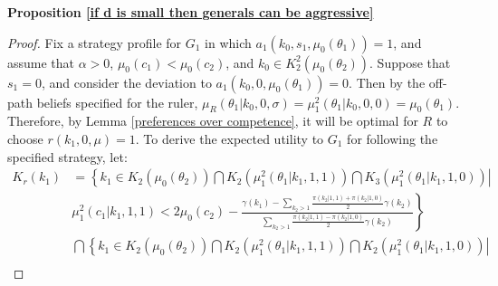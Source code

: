 \documentclass[11pt,]{article}
\begin{document}
\noindent\textbf{Proposition \ref{if d is small then generals can be aggressive}}
\begin{proof}Fix a strategy profile for $G_1$ in which $a_1(k_0,s_1,\mu_0(\theta_1))=1$, and assume that $\alpha>0$, $\mu_0(c_1)<\mu_0(c_2)$, and $k_0\in K^2_2(\mu_0(\theta_2))$.  Suppose that $s_1=0$, and consider the deviation to $a_1(k_0,0,\mu_0(\theta_1))=0$.  Then by the off-path beliefs specified for the ruler, $\mu_R(\theta_1|k_0,0,\sigma)=\mu_1^2(\theta_1|k_0,0,0)=\mu_0(\theta_1)$.  Therefore, by Lemma \ref{preferences over competence}, it will be optimal for $R$ to choose $r(k_1,0,\mu)=1$.  To derive the expected utility to $G_1$ for following the specified strategy, let:
\begin{align*}
K_r(k_1)&=\left\{k_1\in \left.K_2(\mu_0(\theta_2))\bigcap K_2(\mu_1^2(\theta_1|k_1,1,1))\bigcap K_3(\mu_1^2(\theta_1|k_1,1,0))\right|\right.\\
&\left.\mu_1^2(c_1|k_1,1,1)<2\mu_0(c_2)-\frac{\gamma(k_1)-\sum_{k_2>1}\frac{\pi(k_2|1,1)+\pi(k_2|1,0)}{2}\gamma(k_2)}{\sum_{k_2>1}\frac{\pi(k_2|1,1)-\pi(k_2|1,0)}{2}\gamma(k_2)}\right\}\\
&\bigcap\left\{k_1\in \left.K_2(\mu_0(\theta_2))\bigcap K_2(\mu_1^2(\theta_1|k_1,1,1))\bigcap K_2(\mu_1^2(\theta_1|k_1,1,0))\right.\right|\\

\end{align*}
\end{proof}
\end{document}
